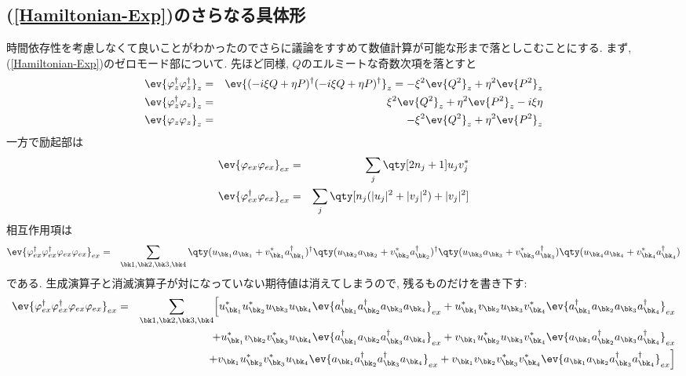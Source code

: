 \documentclass[10.5pt,a4paper]{jreport}
\begin{document}
\subsection{(\ref{Hamiltonian-Exp})のさらなる具体形}
時間依存性を考慮しなくて良いことがわかったのでさらに議論をすすめて数値計算が可能な形まで落としこむことにする. まず, (\ref{Hamiltonian-Exp})のゼロモード部について. 先ほど同様, $Q$のエルミートな奇数次項を落とすと
\begin{eqnarray}
  \nonumber  \ev{\varphi^\dagger_z\varphi^\dagger_z}_z &=& \ev{(-i\xi Q + \eta P)^\dagger(-i\xi Q + \eta P)^\dagger}_z = -\xi^2\ev{Q^2}_z + \eta^2\ev{P^2}_z\\
  \nonumber \ev{\varphi_z^\dagger\varphi_z}_z &=& \xi^2\ev{Q^2}_z + \eta^2\ev{P^2}_z - i\xi\eta\\
  \ev{\varphi_z\varphi_z}_z &=& -\xi^2\ev{Q^2}_z + \eta^2\ev{P^2}_z\label{Zeromode-Exp}
\end{eqnarray}
一方で励起部は
\begin{eqnarray}
  \ev{\varphi_{ex}\varphi_{ex}}_{ex} &=& \sum_j\qty[2n_j + 1]u_jv_j^*\label{BdG-Exp}\\
  \ev{\varphi_{ex}^\dagger\varphi_{ex}}_{ex} &=& \sum_j\qty[n_j(|u_j|^2 + |v_j|^2) + |v_j|^2]
\end{eqnarray}
相互作用項は
\begin{eqnarray}
  \nonumber \ev{\varphi_{ex}^\dagger\varphi_{ex}^\dagger\varphi_{ex}\varphi_{ex}}_{ex} &=& \sum_{\bk1, \bk2, \bk3, \bk4}\qty(u_{\bk_1}a_{\bk_1} + v_{\bk_1}^*a_{\bk_1}^\dagger)^\dagger\qty(u_{\bk_2}a_{\bk_2} + v_{\bk_2}^*a_{\bk_2}^\dagger)^\dagger\qty(u_{\bk_3}a_{\bk_3} + v_{\bk_3}^*a_{\bk_3}^\dagger)\qty(u_{\bk_4}a_{\bk_4} + v_{\bk_4}^*a_{\bk_4}^\dagger)\\
\end{eqnarray}
である. 生成演算子と消滅演算子が対になっていない期待値は消えてしまうので, 残るものだけを書き下す:
\begin{eqnarray}
  \nonumber\ev{\varphi_{ex}^\dagger\varphi_{ex}^\dagger\varphi_{ex}\varphi_{ex}}_{ex} &=& \sum_{\bk1, \bk2, \bk3, \bk4}
  \Bigl[u_{\bk_1}^*u_{\bk_2}^*u_{\bk_3}u_{\bk_4}\ev{a^\dagger_{\bk_1}a^\dagger_{\bk_2}a_{\bk_3}a_{\bk_4}}_{ex} + u_{\bk_1}^*v_{\bk_2}u_{\bk_3}v_{\bk_4}^*\ev{a^\dagger_{\bk_1}a_{\bk_2}a_{\bk_3}a^\dagger_{\bk_4}}_{ex}\\
    \nonumber    &&+ u_{\bk_1}^*v_{\bk_2}v_{\bk_3}^*u_{\bk_4}\ev{a^\dagger_{\bk_1}a_{\bk_2}a^\dagger_{\bk_3}a_{\bk_4}}_{ex} + v_{\bk_1}u_{\bk_2}^*u_{\bk_3}v_{\bk_4}^*\ev{a_{\bk_1}a^\dagger_{\bk_2}a_{\bk_3}a^\dagger_{\bk_4}}_{ex}\\
    \nonumber    &&+ v_{\bk_1}u_{\bk_2}^*v_{\bk_3}^*u_{\bk_4}\ev{a_{\bk_1}a^\dagger_{\bk_2}a^\dagger_{\bk_3}a_{\bk_4}}_{ex} + v_{\bk_1}v_{\bk_2}v_{\bk_3}^*v_{\bk_4}^*\ev{a_{\bk_1}a_{\bk_2}a^\dagger_{\bk_3}a^\dagger_{\bk_4}}_{ex}\Bigr]\\\label{interactionexpectation}
\end{eqnarray}
\end{document}
